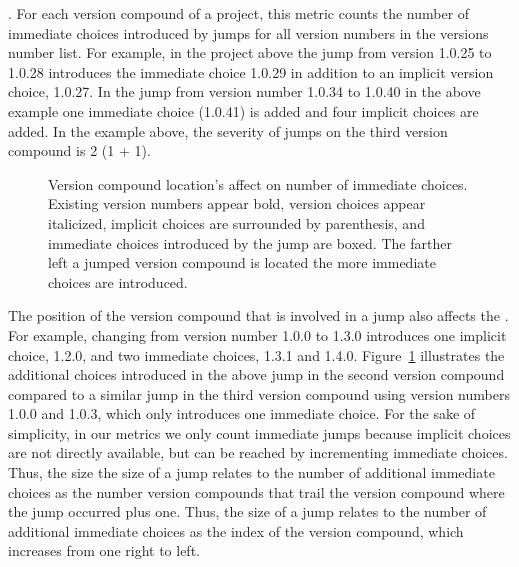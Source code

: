 \documentclass[conference]{IEEEtran}
\begin{document}
.  For each version compound of a project, this metric counts the number of immediate choices introduced by jumps for all version numbers in the versions number list. 
For example, in the project above the jump from version 1.0.25 to 1.0.28 introduces the immediate choice 1.0.29 in addition to an implicit version choice, 1.0.27.
In the jump from version number 1.0.34 to 1.0.40 in the above example one immediate choice (1.0.41) is added and four implicit choices are added.
In the example above, the severity of jumps on the third version compound is 
2 (1 + 1).



\begin{figure}
 \begin{adjustbox}{max width=.5\textwidth}

\end{adjustbox}
\caption{Version compound location's affect on number of immediate choices. Existing version numbers appear bold, version choices appear italicized, implicit choices are surrounded by parenthesis, and immediate choices introduced by the jump are boxed. The farther left a jumped version compound is located the more immediate choices are introduced.}
\label{fig:ExVCJumps}
\end{figure}



The position of the version compound that is involved in a jump also affects the \numberichoices. 
For example, changing from version number 1.0.0 to 1.3.0 introduces one implicit choice, 1.2.0, and two immediate choices, 1.3.1 and 1.4.0. 
Figure~\ref{fig:ExVCJumps} illustrates the additional choices introduced in the above jump in the second version compound compared to a similar jump in the third version compound using version numbers 1.0.0 and 1.0.3, which only introduces one immediate choice. 
For the sake of simplicity, in our metrics we only count immediate jumps because implicit choices are not directly available, but can be reached by incrementing immediate choices.
Thus, the size the size of a jump relates to the number of additional immediate choices as the number version compounds that trail the version compound where the jump occurred plus one. 
Thus, the size of a jump relates to the number of additional immediate choices as the index of the version compound, which increases from one right to left. \\
\end{document}
